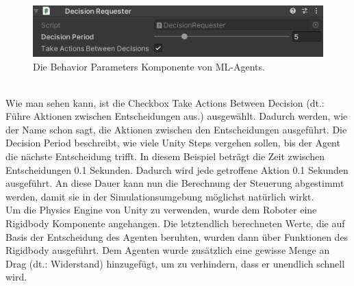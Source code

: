 \begin{figure} [ht]
	\centering
	\includegraphics[width=0.6\columnwidth]{img/decision_requester}
	\caption[Behavior Parameter Komponente]{Die Behavior Parameters Komponente von ML-Agents.}
	\label{fig:decision_requ}
\end{figure}
\\
Wie man sehen kann, ist die Checkbox Take Actions Between Decision (dt.: Führe Aktionen zwischen Entscheidungen aus.) ausgewählt. Dadurch werden, wie der Name schon sagt, die Aktionen zwischen den Entscheidungen ausgeführt. Die Decision Period beschreibt, wie viele Unity Steps vergehen sollen, bis der Agent die nächste Entscheidung trifft. In diesem Beispiel beträgt die Zeit zwischen Entscheidungen 0.1 Sekunden. Dadurch wird jede getroffene Aktion 0.1 Sekunden ausgeführt. An diese Dauer kann nun die Berechnung der Steuerung abgestimmt werden, damit sie in der Simulationsumgebung möglichst natürlich wirkt.
\\
Um die Physics Engine von Unity zu verwenden, wurde dem Roboter eine Rigidbody Komponente angehangen. Die letztendlich berechneten Werte, die auf Basis der Entscheidung des Agenten beruhten, wurden dann über Funktionen des Rigidbody ausgeführt. Dem Agenten wurde zusätzlich eine gewisse Menge an Drag (dt.: Widerstand) hinzugefügt, um zu verhindern, dass er unendlich schnell wird. 

